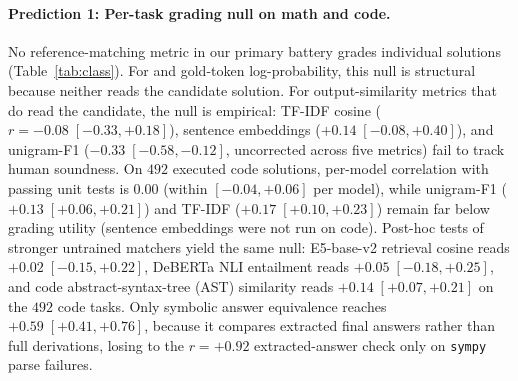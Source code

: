 \paragraph{Prediction 1: Per-task grading null on math and code.}
No reference-matching metric in our primary battery grades individual solutions (Table~\ref{tab:class}).
For \tfa{} and gold-token log-probability, this null is structural because neither reads the candidate solution.
For output-similarity metrics that do read the candidate, the null is empirical: TF-IDF cosine ($r = -0.08 \; [-0.33, +0.18]$), sentence embeddings ($+0.14 \; [-0.08, +0.40]$), and unigram-F1 ($-0.33 \; [-0.58, -0.12]$, uncorrected across five metrics) fail to track human soundness.
On $492$ executed code solutions, per-model \tfa{} correlation with passing unit tests is $0.00$ (within $[-0.04, +0.06]$ per model), while unigram-F1 ($+0.13 \; [+0.06, +0.21]$) and TF-IDF ($+0.17 \; [+0.10, +0.23]$) remain far below grading utility (sentence embeddings were not run on code).
Post-hoc tests of stronger untrained matchers yield the same null: E5-base-v2 retrieval cosine reads $+0.02 \; [-0.15, +0.22]$, DeBERTa NLI entailment reads $+0.05 \; [-0.18, +0.25]$, and code abstract-syntax-tree (AST) similarity reads $+0.14 \; [+0.07, +0.21]$ on the $492$ code tasks.
Only symbolic answer equivalence reaches $+0.59 \; [+0.41, +0.76]$, because it compares extracted final answers rather than full derivations, losing to the $r = +0.92$ extracted-answer check only on \texttt{sympy} parse failures.
